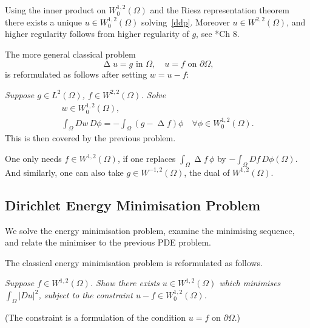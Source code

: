 \documentclass[a4paper]{amsart}
\theoremstyle{plain}
\theoremstyle{definition}
\theoremstyle{remark}
\DeclareMathOperator{\lap}{\Delta}
\begin{document}
Using the inner product on $ W_0^{1,2} (\Omega)$ and the Riesz representation theorem there exists a unique $ u \in W_0^{1,2} (\Omega)
$ solving~\eqref{ddp}.  Moreover $  u \in W^{2,2} (\Omega)$, and higher regularity follows from higher regularity of $ g $, see \cite{GT}*{Ch 8}.

\bigskip 
 The more general classical problem 
\[
\lap u =  g \text{  in }\Omega, \quad u = f \text{ on } \partial \Omega,
\]
is reformulated as follows after setting $ w = u-f $:

\medskip 
\emph{Suppose $ g \in L^2(\Omega) $, $ f \in W^{2,2}(\Omega) $.  Solve}
\begin{equation}\label{dddp}
\begin{gathered}
w \in W_0^{1,2} (\Omega), \\
\int_\Omega Dw\,  D\phi = - \int_\Omega (g - \lap f) \phi \quad \forall \phi \in W_0^{1,2} (\Omega).
\end{gathered} 
\end{equation} 
This is then covered by the previous problem.  

One only needs $ f \in  W^{1,2}(\Omega) $, if one replaces $ \int_\Omega \lap f \, \phi $ by $ -\int_\Omega Df\, D\phi (\Omega)$.  And similarly,  one can also take $ g \in W^{-1,2}(\Omega)$, the dual of $  W^{1,2}(\Omega)$.





\subsection{Dirichlet Energy Minimisation Problem} We   solve the energy minimisation problem, examine  the minimising sequence, and relate the minimiser to the previous PDE problem.  

The classical energy minimisation problem is reformulated as follows.

\medskip 
\emph{Suppose $ f \in W^{1,2}(\Omega) $.  Show there exists $ u \in W^{1,2}(\Omega) $ which minimises $ \int_\Omega |Du|^2 $, subject to the constraint $ u-f \in W_0^{1,2}(\Omega) $.}

\medskip (The constraint is a formulation of the condition $ u=f $ on $ \partial \Omega $.)
\end{document}
